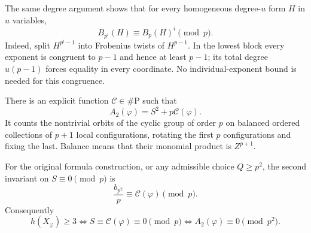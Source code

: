 The same degree argument shows that for every homogeneous degree-$u$
form $H$ in $u$ variables,
\[
 B_{p^i}(H)\equiv B_p(H)^i\pmod p.
\]
Indeed, split $H^{p^i-1}$ into Frobenius twists of $H^{p-1}$. In the
lowest block every exponent is congruent to $p-1$ and hence at least
$p-1$; its total degree $u(p-1)$ forces equality in every coordinate.
No individual-exponent bound is needed for this congruence.

\begin{theorem}\label{fg:thm:orbit}
There is an explicit function $\mathcal C\in\#\mathrm P$ such that
\begin{equation}\label{fg:eq:orbit-count}
 A_2(\varphi)=S^2+p\mathcal C(\varphi).
\end{equation}
It counts the nontrivial orbits of the cyclic group of order $p$ on
balanced ordered collections of $p+1$ local configurations, rotating
the first $p$ configurations and fixing the last. Balance means that
their monomial product is $Z^{p+1}$.

For the original formula construction, or any admissible choice
$Q\ge p^2$, the second invariant on $S\equiv0\pmod p$ is
\[
 \frac{b_{p^2}}p\equiv\mathcal C(\varphi)\pmod p.
\]
Consequently
\begin{equation}\label{fg:eq:height-three-count}
 h(X_\varphi)\ge3
 \iff S\equiv\mathcal C(\varphi)\equiv0\pmod p
 \iff A_2(\varphi)\equiv0\pmod{p^2}.
\end{equation}
\end{theorem}

